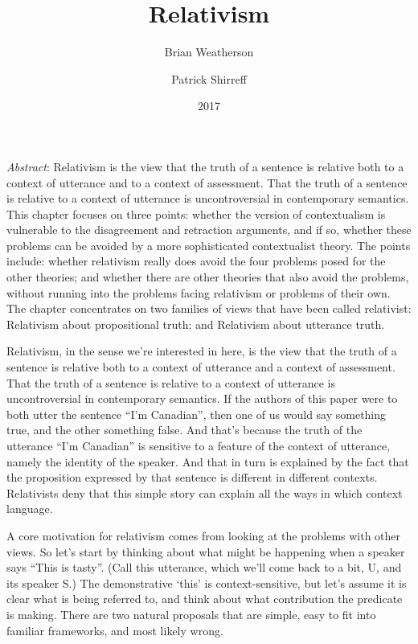 \documentclass[
  11pt,
  letterpaper,
  DIV=11,
  numbers=noendperiod,
  twoside]{scrartcl}
\title{Relativism}
\author{Brian Weatherson \and Patrick Shirreff}
\date{2017}
\renewenvironment{abstract}
 {\vspace{-1.25cm}
 \quotation\small\noindent\emph{Abstract}:}
 {\endquotation}
\renewenvironment{abstract}
 {\quotation\small\noindent\emph{Abstract}:}
 {\endquotation\vspace{-0.02cm}}
\begin{document}
\maketitle
\begin{abstract}
Relativism is the view that the truth of a sentence is relative both to
a context of utterance and to a context of assessment. That the truth of
a sentence is relative to a context of utterance is uncontroversial in
contemporary semantics. This chapter focuses on three points: whether
the version of contextualism is vulnerable to the disagreement and
retraction arguments, and if so, whether these problems can be avoided
by a more sophisticated contextualist theory. The points include:
whether relativism really does avoid the four problems posed for the
other theories; and whether there are other theories that also avoid the
problems, without running into the problems facing relativism or
problems of their own. The chapter concentrates on two families of views
that have been called relativist: Relativism about propositional truth;
and Relativism about utterance truth.
\end{abstract}


Relativism, in the sense we're interested in here, is the view that the
truth of a sentence is relative both to a context of utterance and a
context of assessment. That the truth of a sentence is relative to a
context of utterance is uncontroversial in contemporary semantics. If
the authors of this paper were to both utter the sentence ``I'm
Canadian'', then one of us would say something true, and the other
something false. And that's because the truth of the utterance ``I'm
Canadian'' is sensitive to a feature of the context of utterance, namely
the identity of the speaker. And that in turn is explained by the fact
that the proposition expressed by that sentence is different in
different contexts. Relativists deny that this simple story can explain
all the ways in which context language.

A core motivation for relativism comes from looking at the problems with
other views. So let's start by thinking about what might be happening
when a speaker says ``This is tasty''. (Call this utterance, which we'll
come back to a bit, U, and its speaker S.) The demonstrative `this' is
context-sensitive, but let's assume it is clear what is being referred
to, and think about what contribution the predicate is making. There are
two natural proposals that are simple, easy to fit into familiar
frameworks, and most likely wrong.
\end{document}

